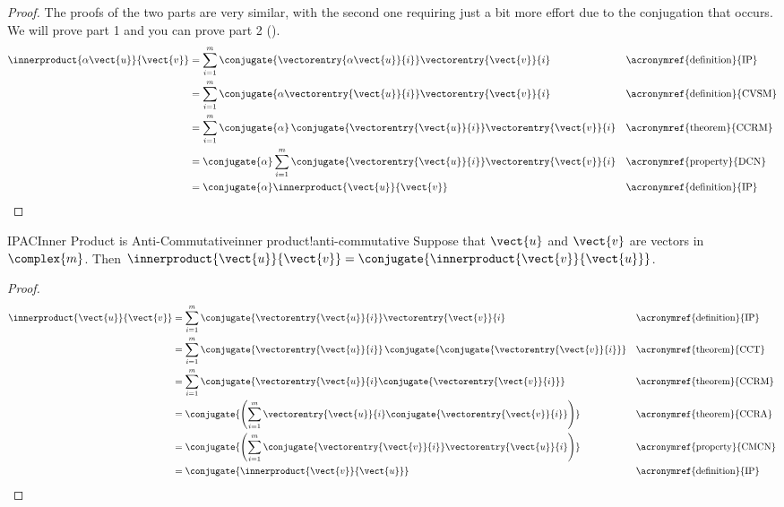 \begin{proof}
The proofs of the two parts are very similar, with the second one requiring just a bit more effort due to the conjugation that occurs.  We will prove part 1 and you can prove part 2  ().
%
\begin{align*}
\innerproduct{\alpha\vect{u}}{\vect{v}}
&=\sum_{i=1}^{m}\conjugate{\vectorentry{\alpha\vect{u}}{i}}\vectorentry{\vect{v}}{i}
&&\text{\acronymref{definition}{IP}}\\
%
&=\sum_{i=1}^{m}\conjugate{\alpha\vectorentry{\vect{u}}{i}}\vectorentry{\vect{v}}{i}
&&\text{\acronymref{definition}{CVSM}}\\
%
&=\sum_{i=1}^{m}\conjugate{\alpha}\,\conjugate{\vectorentry{\vect{u}}{i}}\vectorentry{\vect{v}}{i}
&&\text{\acronymref{theorem}{CCRM}}\\
%
&=\conjugate{\alpha}\sum_{i=1}^{m}\conjugate{\vectorentry{\vect{u}}{i}}\vectorentry{\vect{v}}{i}
&&\text{\acronymref{property}{DCN}}\\
%
&=\conjugate{\alpha}\innerproduct{\vect{u}}{\vect{v}}
&&\text{\acronymref{definition}{IP}}
%
\end{align*}
%
\end{proof}
%
\begin{theorem}{IPAC}{Inner Product is Anti-Commutative}{inner product!anti-commutative}
Suppose that $\vect{u}$ and $\vect{v}$ are vectors in $\complex{m}$.  Then
$\innerproduct{\vect{u}}{\vect{v}}=\conjugate{\innerproduct{\vect{v}}{\vect{u}}}$.
\end{theorem}
%
\begin{proof}
\begin{align*}
\innerproduct{\vect{u}}{\vect{v}}
&=\sum_{i=1}^{m}\conjugate{\vectorentry{\vect{u}}{i}}\vectorentry{\vect{v}}{i}
&&\text{\acronymref{definition}{IP}}\\
%
&=\sum_{i=1}^{m}\conjugate{\vectorentry{\vect{u}}{i}}\,\conjugate{\conjugate{\vectorentry{\vect{v}}{i}}}
&&\text{\acronymref{theorem}{CCT}}\\
%
&=\sum_{i=1}^{m}\conjugate{\vectorentry{\vect{u}}{i}\conjugate{\vectorentry{\vect{v}}{i}}}
&&\text{\acronymref{theorem}{CCRM}}\\
%
&=\conjugate{\left(\sum_{i=1}^{m}\vectorentry{\vect{u}}{i}\conjugate{\vectorentry{\vect{v}}{i}}\right)}
&&\text{\acronymref{theorem}{CCRA}}\\
%
&=\conjugate{\left(\sum_{i=1}^{m}\conjugate{\vectorentry{\vect{v}}{i}}\vectorentry{\vect{u}}{i}\right)}
&&\text{\acronymref{property}{CMCN}}\\
%
&=\conjugate{\innerproduct{\vect{v}}{\vect{u}}}
&&\text{\acronymref{definition}{IP}}\\
\end{align*}
\end{proof}
